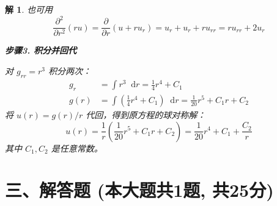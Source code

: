 \documentclass[12pt,a4paper]{article}
\newcommand{\diff}{\mathop{}\!\mathrm{d}}  %
\newtheorem*{solution}{解}
\begin{document}
\begin{solution}
		也可用
		\begin{equation*}
			\frac{\partial^2}{\partial r^2}(ru) = \frac{\partial}{\partial r}(u + ru_r) = u_r + u_r + r u_{rr} = r u_{rr} + 2u_r
		\end{equation*}
		\hrulefill
		
		\textbf{步骤3. 积分并回代}
		
		\noindent
		对 $g_{rr} = r^3$ 积分两次：
		\begin{align*}
			g_r &= \int r^3 \diff r = \frac{1}{4}r^4 + C_1 \\
			g(r) &= \int \left(\frac{1}{4}r^4 + C_1\right) \diff r = \frac{1}{20}r^5 + C_1 r + C_2
		\end{align*}
		将 $u(r) = g(r)/r$ 代回，得到原方程的球对称解：
		\[
		u(r) = \frac{1}{r}\left(\frac{1}{20}r^5 + C_1 r + C_2\right) = \frac{1}{20}r^4 + C_1 + \frac{C_2}{r}
		\]
		其中 $C_1, C_2$ 是任意常数。
	\end{solution}
	
	\newpage
	\section*{三、解答题 (本大题共1题, 共25分)}
\end{document}
